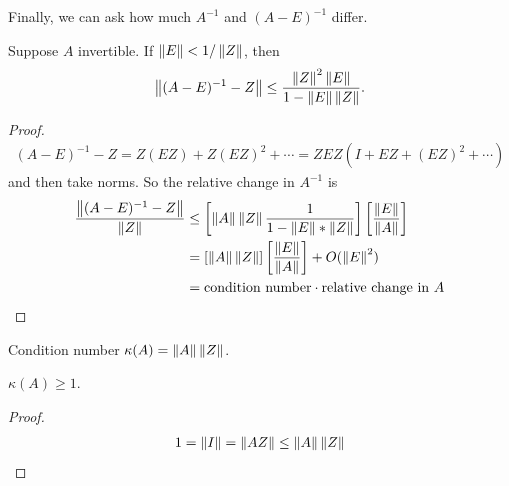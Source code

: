 \documentclass[11pt]{article}
\numberwithin{equation}{section}
\begin{document}
Finally, we can ask how much $A^{-1}$ and $(A-E)^{-1}$ differ.

\begin{lemma}
    Suppose $A$ invertible. If $\left\| E \right\| < 1/\left\| Z \right\|$, then \begin{align*}
        \left\| (A-E)^{-1}-Z \right\| \leq \frac{\left\| Z \right\|^2\left\| E \right\|}{1-\left\| E \right\|\left\| Z \right\|}.
    \end{align*}
    \begin{proof}
        \begin{align*}
            (A-E)^{-1}-Z = Z(EZ) + Z(EZ)^2 + \cdots = ZEZ ( I + EZ + (EZ)^2 + \cdots)
        \end{align*}
        and then take norms. So the relative change in $A^{-1}$ is \begin{align*}
            \frac{\left\| (A-E)^{-1}-Z \right\|}{\left\| Z \right\|} &\leq \left[  \left\| A \right\|\left\| Z \right\| \frac{1}{1 - \left\| E \right\|*\left\| Z \right\|}  \right]\left[ \frac{\left\| E \right\|}{\left\| A \right\|} \right] \\
            &= \left[  \left\| A \right\|\left\| Z \right\|\right]\left[ \frac{\left\| E \right\|}{\left\| A \right\|} \right]+ O(\left\| E \right\|^2) \\
            &= \text{condition number} \cdot \text{relative change in }A
        \end{align*}
    \end{proof}
\end{lemma}

\begin{definition}
    Condition number $\kappa(A) = \left\| A \right\|\left\| Z \right\|$.
\end{definition}

\begin{fact}
    $\kappa(A) \geq 1$.
    \begin{proof}
        \begin{align*}
            1 = \left\| I \right\| = \left\| AZ \right\| \leq \left\| A \right\|\left\| Z \right\|
        \end{align*}
    \end{proof}
\end{fact}
\end{document}
